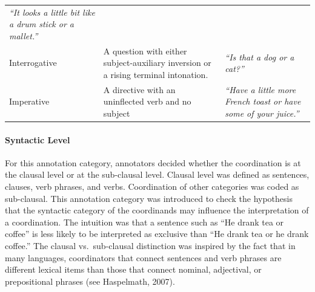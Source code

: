 \documentclass[floatsintext,man]{apa6}
\theoremstyle{definition}
\theoremstyle{definition}
\theoremstyle{definition}
\theoremstyle{remark}
\begin{document}
\begin{longtable}[]{@{}lll@{}}
\begin{minipage}[t]{0.32\columnwidth}
\emph{\enquote{It looks a little bit like a drum stick or a
mallet.}}\strut
\end{minipage}\tabularnewline
\begin{minipage}[t]{0.18\columnwidth}\raggedright\strut
Interrogative\strut
\end{minipage} & \begin{minipage}[t]{0.42\columnwidth}\raggedright\strut
A question with either subject-auxiliary inversion or a rising terminal
intonation.\strut
\end{minipage} & \begin{minipage}[t]{0.32\columnwidth}\raggedright\strut
\emph{\enquote{Is that a dog or a cat?}}\strut
\end{minipage}\tabularnewline
\begin{minipage}[t]{0.18\columnwidth}\raggedright\strut
Imperative\strut
\end{minipage} & \begin{minipage}[t]{0.42\columnwidth}\raggedright\strut
A directive with an uninflected verb and no subject\strut
\end{minipage} & \begin{minipage}[t]{0.32\columnwidth}\raggedright\strut
\emph{\enquote{Have a little more French toast or have some of your
juice.}}\strut
\end{minipage}\tabularnewline
\bottomrule
\end{longtable}

\paragraph{Syntactic Level}\label{syntactic-level}

For this annotation category, annotators decided whether the
coordination is at the clausal level or at the sub-clausal level.
Clausal level was defined as sentences, clauses, verb phrases, and
verbs. Coordination of other categories was coded as sub-clausal. This
annotation category was introduced to check the hypothesis that the
syntactic category of the coordinands may influence the interpretation
of a coordination. The intuition was that a sentence such as \enquote{He
drank tea or coffee} is less likely to be interpreted as exclusive than
\enquote{He drank tea or he drank coffee.} The clausal vs.~sub-clausal
distinction was inspired by the fact that in many languages,
coordinators that connect sentences and verb phrases are different
lexical items than those that connect nominal, adjectival, or
prepositional phrases (see Haspelmath, 2007).
\end{document}

